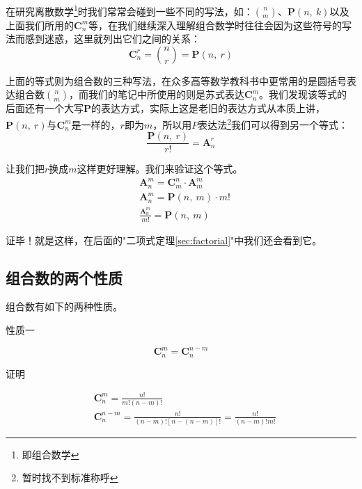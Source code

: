 在研究离散数学\footnote{即组合数学}时我们常常会碰到一些不同的写法，如：$\binom{n}{m}$、$\textbf{P}(n,~k)$以及上面我们所用的$\textbf{C}_{n}^m$等，在我们继续深入理解组合数学时往往会因为这些符号的写法而感到迷惑，这里就列出它们之间的关系：
\begin{equation*}
    \textbf{C}_{n}^{r} = \binom{n}{r} = \textbf{P}(n,~r)
\end{equation*}

上面的等式则为组合数的三种写法，在众多高等数学教科书中更常用的是圆括号表达组合数$\binom{n}{m}$，而我们的笔记中所使用的则是苏式表达$\textbf{C}_{n}^m$。我们发现该等式的后面还有一个大写$\textbf{P}$的表达方式，实际上这是老旧的表达方式从本质上讲，$\textbf{P}(n,~r)$与$\textbf{C}_{n}^m$是一样的，$r$即为$m$，所以用$P$表达法\footnote{暂时找不到标准称呼}我们可以得到另一个等式：
\begin{equation*}
    \frac{\textbf{P}(n,~r)}{r!} = \textbf{A}_{n}^r
\end{equation*}

让我们把$r$换成$m$这样更好理解。我们来验证这个等式。
\begin{equation*}
    \begin{aligned}
        &\textbf{A}_{n}^m = \textbf{C}_{m}^n \cdot \textbf{A}_{m}^{m} \\
        &\textbf{A}_{n}^m = \textbf{P}(n,~m) \cdot m! \\
        &\frac{\textbf{A}_{n}^m}{m!} = \textbf{P}(n,~m)
    \end{aligned}
\end{equation*}

证毕！就是这样，在后面的"二项式定理\ref{sec:factorial}"中我们还会看到它。

\subsection{组合数的两个性质}

组合数有如下的两种性质。
\begin{flushleft}{\color{blue} 性质一}\end{flushleft}
\begin{equation}
    \textbf{C}_{n}^{m}=\textbf{C}_{n}^{n-m}
\end{equation}
\begin{flushleft}
	{\color{blue} 证明}
\end{flushleft}
\begin{equation*}
    \begin{aligned}
        &\textbf{C}_{n}^{m} = \frac{n!}{m!(n-m)!} \\
        &\textbf{C}_{n}^{n-m} = \frac{n!}{(n-m)![n-(n-m)]!} = \frac{n!}{(n-m)!m!}
    \end{aligned}
\end{equation*}

